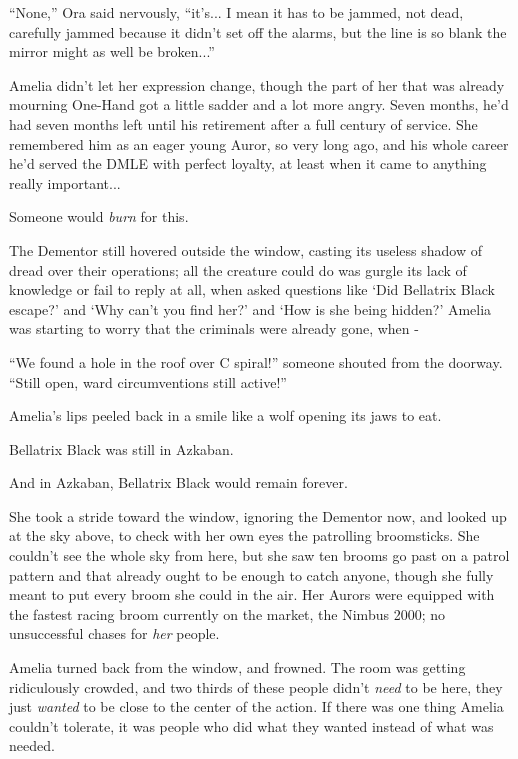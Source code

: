 ``None,'' Ora said nervously, ``it's... I mean it has to be jammed,
not dead, carefully jammed because it didn't set off the alarms, but the
line is so blank the mirror might as well be broken...''

Amelia didn't let her expression change, though the part of her that was
already mourning One-Hand got a little sadder and a lot more angry.
Seven months, he'd had seven months left until his retirement after a
full century of service. She remembered him as an eager young Auror, so
very long ago, and his whole career he'd served the DMLE with perfect
loyalty, at least when it came to anything really important...

Someone would \emph{burn} for this.

The Dementor still hovered outside the window, casting its useless
shadow of dread over their operations; all the creature could do was
gurgle its lack of knowledge or fail to reply at all, when asked
questions like `Did Bellatrix Black escape?' and `Why can't you find
her?' and `How is she being hidden?' Amelia was starting to worry that
the criminals were already gone, when -

``We found a hole in the roof over C spiral!'' someone shouted from the
doorway. ``Still open, ward circumventions still active!''

Amelia's lips peeled back in a smile like a wolf opening its jaws to
eat.

Bellatrix Black was still in Azkaban.

And in Azkaban, Bellatrix Black would remain forever.

She took a stride toward the window, ignoring the Dementor now, and
looked up at the sky above, to check with her own eyes the patrolling
broomsticks. She couldn't see the whole sky from here, but she saw ten
brooms go past on a patrol pattern and that already ought to be enough
to catch anyone, though she fully meant to put every broom she could in
the air. Her Aurors were equipped with the fastest racing broom
currently on the market, the Nimbus 2000; no unsuccessful chases for
\emph{her} people.

Amelia turned back from the window, and frowned. The room was getting
ridiculously crowded, and two thirds of these people didn't \emph{need}
to be here, they just \emph{wanted} to be close to the center of the
action. If there was one thing Amelia couldn't tolerate, it was people
who did what they wanted instead of what was needed.

